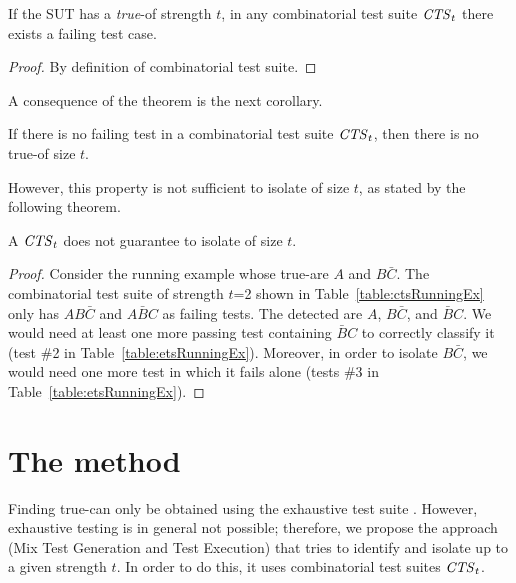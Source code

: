 \begin{tikzborder}{\cite{Gargantini16:validation}}
\begin{tikzborder}{\cite{gargantini_combinatorial_2017}}
\begin{tikzborder}{\cite{gargantini_combinatorial_2017}}
\begin{tikzborder}{\cite{garn2019}}
\begin{tikzborder}{\cite{arcaini2019achieving}}
\begin{tikzborder}{}
\begin{thm}\label{thm:trueMficCTSt}
	If the SUT has a \emph{true}-\mfic of strength $t$, in any combinatorial test suite $\mathit{CTS}_t$ there exists a failing test case.
\end{thm}

\begin{proof}
	By definition of combinatorial test suite.
\end{proof}

A consequence of the theorem is the next corollary.

\begin{corollary}
	If there is no failing test in a combinatorial test suite $\mathit{CTS}_t$, then there is no true-\mfic of size $t$.
\end{corollary}

However, this property is not sufficient to isolate \mfics of size $t$, as stated by the following theorem.

\begin{thm}\label{thm:insufficientAccuracyCTSt}
	A $\mathit{CTS}_t$ does not guarantee to isolate \mfics of size $t$.
\end{thm}

\begin{proof}
	Consider the running example whose true-\mfics are $A$ and $B\bar{C}$. The combinatorial test suite of strength $t$=2 shown in Table~\ref{table:ctsRunningEx} only has $AB\bar{C}$ and $A\bar{B}C$ as failing tests.
	The detected \mfics are $A$, $B\bar{C}$, and $\bar{B}C$. We would need at least one more passing test containing $\bar{B}C$ to correctly classify it (test \#2 in Table~\ref{table:etsRunningEx}). Moreover, in order to isolate $B\bar{C}$, we would need one more test in which it fails alone (tests \#3 in Table~\ref{table:etsRunningEx}).
\end{proof}

\end{tikzborder}
\section{The \mix method}\label{sec:proposedApproach}
\begin{tikzborder}{}	

Finding true-\mfics can only be obtained using the exhaustive test suite \ets. However, exhaustive testing is in general not possible; therefore, we propose the approach \mix (Mix Test Generation and Test Execution) that tries to identify and isolate \mfics up to a given strength $t$. In order to do this, it uses combinatorial test suites $\mathit{CTS}_t$.


\end{tikzborder}
\end{tikzborder}
\end{tikzborder}
\end{tikzborder}
\end{tikzborder}
\end{tikzborder}
